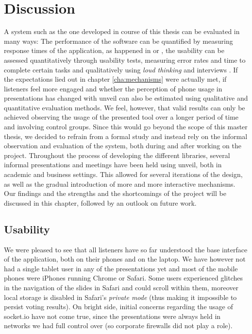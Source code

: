\chapter{Discussion}
\label{cha:discussion}

A system such as the one developed in course of this thesis can be evaluated in many ways: The performance of the software can be quantified by measuring response times of the application, as happened in \cite{Niwa:Web-presentation-powerpoint} or \cite{Inoue:RealTimeQuestionnaire}, the usability can be assessed quantitatively through usability tests, measuring error rates and time to complete certain tasks and qualitatively using \emph{loud thinking} and interviews \cite{Reindl:automatisierte-user-interface-evaluierung}. If the expectations lied out in chapter \ref{cha:mechanisms} were actually met, if listeners feel more engaged and whether the perception of phone usage in presentations has changed with unveil can also be estimated using qualitative and quantitative evaluation methods. We feel, however, that valid results can only be achieved observing the usage of the presented tool over a longer period of time and involving control groups. Since this would go beyond the scope of this master thesis, we decided to refrain from a formal study and instead rely on the informal observation and evaluation of the system, both during and after working on the project.
Throughout the process of developing the different libraries, several informal presentations and meetings have been held using unveil, both in academic and business settings. This allowed for several iterations of the design, as well as the gradual introduction of more and more interactive mechanisms. Our findings and the strengths and the shortcomings of the project will be discussed in this chapter, followed by an outlook on future work.

\section{Usability}
We were pleased to see that all listeners have so far understood the base interface of the application, both on their phones and on the laptop. We have however not had a single tablet user in any of the presentations yet and most of the mobile phones were iPhones running Chrome or Safari. Some users experienced glitches in the navigation of the slides in Safari and could scroll within them, moreover local storage is disabled in Safari's \emph{private mode} (thus making it impossible to persist voting results). On bright side, initial concerns regarding the usage of socket.io have not come true, since the presentations were always held in networks we had full control over (so corporate firewalls did not play a role).

